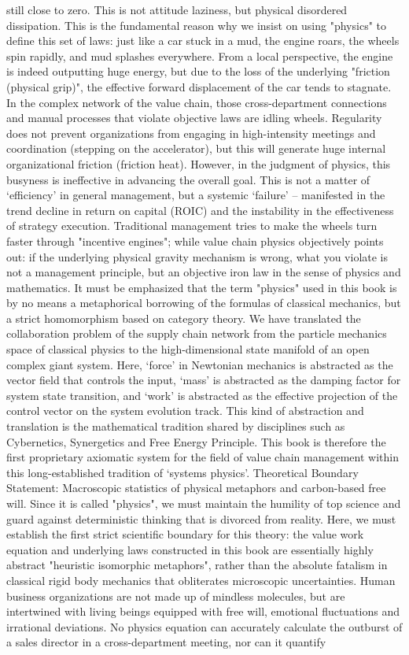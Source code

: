 \documentclass[11pt,a4paper]{article}
\begin{document}
still close to zero. This is not attitude laziness, but physical disordered dissipation. This is the fundamental reason why we insist on using "physics" to define this set of laws: just like a car stuck in a mud, the engine roars, the wheels spin rapidly, and mud splashes everywhere. From a local perspective, the engine is indeed outputting huge energy, but due to the loss of the underlying "friction (physical grip)", the effective forward displacement of the car tends to stagnate. In the complex network of the value chain, those cross-department connections and manual processes that violate objective laws are idling wheels. Regularity does not prevent organizations from engaging in high-intensity meetings and coordination (stepping on the accelerator), but this will generate huge internal organizational friction (friction heat). However, in the judgment of physics, this busyness is ineffective in advancing the overall goal. This is not a matter of ‘efficiency’ in general management, but a systemic ‘failure’ – manifested in the trend decline in return on capital (ROIC) and the instability in the effectiveness of strategy execution. Traditional management tries to make the wheels turn faster through "incentive engines"; while value chain physics objectively points out: if the underlying physical gravity mechanism is wrong, what you violate is not a management principle, but an objective iron law in the sense of physics and mathematics. It must be emphasized that the term "physics" used in this book is by no means a metaphorical borrowing of the formulas of classical mechanics, but a strict homomorphism based on category theory. We have translated the collaboration problem of the supply chain network from the particle mechanics space of classical physics to the high-dimensional state manifold of an open complex giant system. Here, ‘force’ in Newtonian mechanics is abstracted as the vector field that controls the input, ‘mass’ is abstracted as the damping factor for system state transition, and ‘work’ is abstracted as the effective projection of the control vector on the system evolution track. This kind of abstraction and translation is the mathematical tradition shared by disciplines such as Cybernetics, Synergetics and Free Energy Principle. This book is therefore the first proprietary axiomatic system for the field of value chain management within this long-established tradition of ‘systems physics’. Theoretical Boundary Statement: Macroscopic statistics of physical metaphors and carbon-based free will. Since it is called "physics", we must maintain the humility of top science and guard against deterministic thinking that is divorced from reality. Here, we must establish the first strict scientific boundary for this theory: the value work equation and underlying laws constructed in this book are essentially highly abstract "heuristic isomorphic metaphors", rather than the absolute fatalism in classical rigid body mechanics that obliterates microscopic uncertainties. Human business organizations are not made up of mindless molecules, but are intertwined with living beings equipped with free will, emotional fluctuations and irrational deviations. No physics equation can accurately calculate the outburst of a sales director in a cross-department meeting, nor can it quantify 
\end{document}
